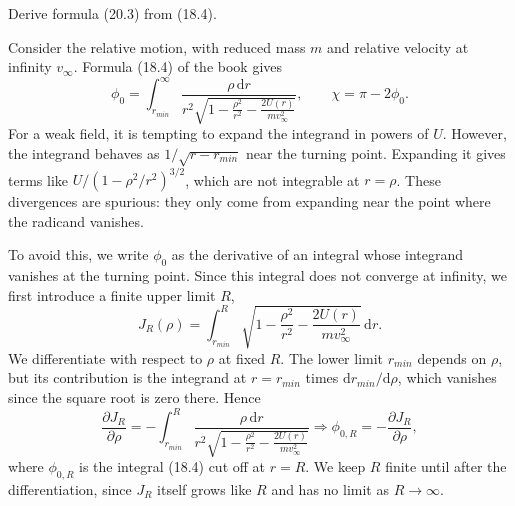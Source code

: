 \begin{problem}[title={Deriving the small-angle scattering formula}]
{
Derive formula (20.3) from (18.4).
}
{
Consider the relative motion, with reduced mass $m$ and relative velocity at infinity $v_\infty$. Formula (18.4) of the book gives
\begin{equation*}
    \phi_0 = \int_{r_{min}}^\infty \frac{\rho\,\mathrm{d}r}{r^2\sqrt{1 - \frac{\rho^2}{r^2} - \frac{2U(r)}{mv_\infty^2}}}, \qquad \chi = \pi - 2\phi_0.
\end{equation*}
For a weak field, it is tempting to expand the integrand in powers of $U$. However, the integrand behaves as $1/\sqrt{r - r_{min}}$ near the turning point. Expanding it gives terms like $U/(1 - \rho^2/r^2)^{3/2}$, which are not integrable at $r = \rho$. These divergences are spurious: they only come from expanding near the point where the radicand vanishes.

To avoid this, we write $\phi_0$ as the derivative of an integral whose integrand vanishes at the turning point. Since this integral does not converge at infinity, we first introduce a finite upper limit $R$,
\begin{equation*}
    J_R(\rho) = \int_{r_{min}}^R \sqrt{1 - \frac{\rho^2}{r^2} - \frac{2U(r)}{mv_\infty^2}}\,\mathrm{d}r.
\end{equation*}
We differentiate with respect to $\rho$ at fixed $R$. The lower limit $r_{min}$ depends on $\rho$, but its contribution is the integrand at $r = r_{min}$ times $\mathrm{d}r_{min}/\mathrm{d}\rho$, which vanishes since the square root is zero there. Hence
\begin{equation*}
    \frac{\partial J_R}{\partial\rho} = -\int_{r_{min}}^R \frac{\rho\,\mathrm{d}r}{r^2\sqrt{1 - \frac{\rho^2}{r^2} - \frac{2U(r)}{mv_\infty^2}}} \Rightarrow \phi_{0,R} = -\frac{\partial J_R}{\partial\rho},
\end{equation*}
where $\phi_{0,R}$ is the integral (18.4) cut off at $r = R$. We keep $R$ finite until after the differentiation, since $J_R$ itself grows like $R$ and has no limit as $R \to \infty$.

}
\end{problem}
